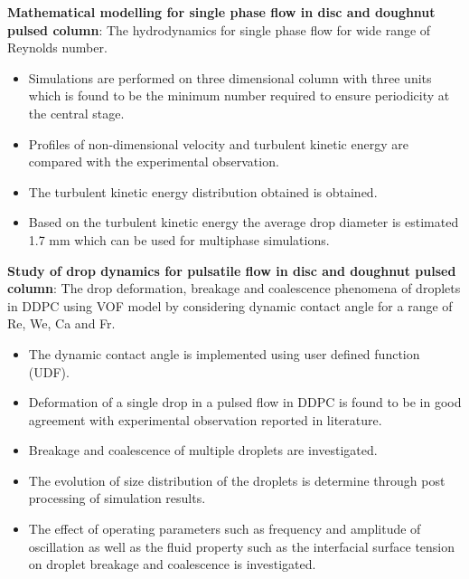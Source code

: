 \documentclass[a4paper,12pt]{article}
\begin{document}
\begin{itemize}
\textbf{Mathematical modelling for single phase flow in disc and doughnut pulsed column}: The hydrodynamics for single phase flow for wide range of Reynolds number.
\begin{itemize}
  \item Simulations are performed on three dimensional column with three units which is found to be the minimum number required to ensure periodicity at the central stage.
  \item Profiles of non-dimensional velocity and turbulent kinetic energy are compared with the experimental observation.
  \item The turbulent kinetic energy distribution obtained is obtained.
  \item Based on the turbulent kinetic energy the average drop diameter is estimated 1.7 mm which can be used for multiphase simulations.
\end{itemize}

\textbf{Study of drop dynamics for pulsatile flow in disc and doughnut pulsed column}: The drop deformation, breakage and coalescence phenomena of droplets in DDPC using VOF model by considering dynamic contact angle for a range of Re, We, Ca and Fr.
\begin{itemize}
  \item The dynamic contact angle is implemented using user defined function (UDF).
  \item Deformation of a single drop in a pulsed flow in DDPC is found to be in good agreement with experimental observation reported in literature.
  \item Breakage and coalescence of multiple droplets are investigated.
  \item The evolution of size distribution of the droplets is determine through post processing of simulation results.
  \item The effect of operating parameters such as frequency and amplitude of oscillation as well as the fluid property such as the interfacial surface tension on droplet breakage and coalescence is investigated.
\end{itemize}


\end{itemize}
\end{document}
